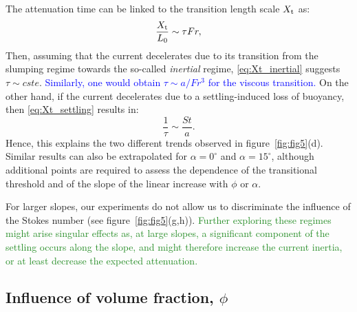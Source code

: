 \documentclass[twocolumn]{article}
\newcommand*{\cyril}{\textcolor{ForestGreen}}
\begin{document}
The attenuation time can be linked to the transition length scale $X_{\rm t}$ as:
\begin{equation}
	\label{eq:link_attenuation_transition_length}
	\frac{X_{\rm t}}{L_0} \sim \tau Fr,
\end{equation}
%
Then, assuming that the current decelerates due to its transition from the slumping regime towards the so-called \emph{inertial} regime, \eqref{eq:Xt_inertial} suggests $\tau \sim cste$. \textcolor{blue}{Similarly, one would obtain $\tau\sim a/Fr^{3}$ for the viscous transition.} On the other hand, if the current decelerates due to a settling-induced loss of buoyancy, then \eqref{eq:Xt_settling} results in:
\begin{equation}
	\frac{1}{\tau} \sim \frac{St}{a}.
\end{equation}
Hence, this explains the two different trends observed in figure~\ref{fig:fig5}(d). Similar results can also be extrapolated for $\alpha = 0^\circ$ and $\alpha = 15^\circ$, although additional points are required to assess the dependence of the transitional threshold and of the slope of the linear increase with $\phi$ or $\alpha$.

For larger slopes, our experiments do not allow us to discriminate the influence of the Stokes number (see figure~\ref{fig:fig5}(g,h)). \cyril{Further exploring these regimes might arise singular effects as, at large slopes, a significant component of the settling occurs along the slope, and might therefore increase the current inertia, or at least decrease the expected attenuation.}

\subsection{Influence of volume fraction, $\phi$}
\label{sec:influence_phi}
\end{document}
